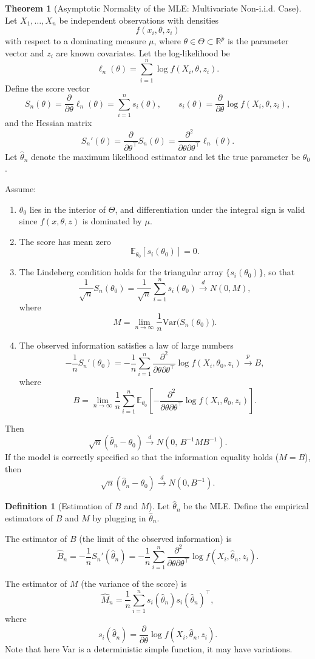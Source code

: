 \documentclass[11pt]{article}
\theoremstyle{definition}
\newtheorem{defn}{Definition}[section]
\newtheorem{theo}{Theorem}[section]
\begin{document}
\begin{theo}[Asymptotic Normality of the MLE: Multivariate Non-i.i.d. Case]
Let $X_1,\dots,X_n$ be independent observations with densities
\[
f(x_i,\theta,z_i)
\]
with respect to a dominating measure $\mu$, where $\theta\in\Theta\subset\mathbb{R}^p$
is the parameter vector and $z_i$ are known covariates. Let the log-likelihood be
\[
\ell_n(\theta)=\sum_{i=1}^n \log f(X_i,\theta,z_i).
\]
Define the score vector
\[
S_n(\theta)
=
\frac{\partial}{\partial\theta}\ell_n(\theta)
=
\sum_{i=1}^n s_i(\theta),
\qquad
s_i(\theta)=\frac{\partial}{\partial\theta}\log f(X_i,\theta,z_i),
\]
and the Hessian matrix
\[
S_n'(\theta)
=
\frac{\partial}{\partial\theta^\top}S_n(\theta)
=
\frac{\partial^2}{\partial\theta\partial\theta^\top}\ell_n(\theta).
\]
Let $\hat\theta_n$ denote the maximum likelihood estimator and let the
true parameter be $\theta_0$.

Assume:
\begin{enumerate}
\item $\theta_0$ lies in the interior of $\Theta$, and differentiation
under the integral sign is valid since $f(x,\theta,z)$ is dominated by $\mu$.
\item The score has mean zero
\[
\mathbb{E}_{\theta_0}[s_i(\theta_0)]=0 .
\]
\item The Lindeberg condition holds for the triangular array
$\{s_i(\theta_0)\}$, so that
\[
\frac{1}{\sqrt{n}}S_n(\theta_0)
=
\frac{1}{\sqrt{n}}\sum_{i=1}^n s_i(\theta_0)
\xrightarrow{d}
N(0,M),
\]
where
\[
M
=
\lim_{n\to\infty}
\frac{1}{n}\mathrm{Var}\big(S_n(\theta_0)\big).
\]
\item The observed information satisfies a law of large numbers
\[
-\frac{1}{n}S_n'(\theta_0)
=
-\frac{1}{n}\sum_{i=1}^n
\frac{\partial^2}{\partial\theta\partial\theta^\top}
\log f(X_i,\theta_0,z_i)
\xrightarrow{p}
B,
\]
where
\[
B
=
\lim_{n\to\infty}
\frac{1}{n}\sum_{i=1}^n
\mathbb{E}_{\theta_0}
\!\left[
-
\frac{\partial^2}{\partial\theta\partial\theta^\top}
\log f(X_i,\theta_0,z_i)
\right].
\]
\end{enumerate}
Then
\[
\sqrt{n}(\hat\theta_n-\theta_0)
\xrightarrow{d}
N\!\left(0,\,B^{-1}MB^{-1}\right).
\]
If the model is correctly specified so that the information equality holds
($M=B$), then
\[
\sqrt{n}(\hat\theta_n-\theta_0)
\xrightarrow{d}
N(0,B^{-1}).
\]
\end{theo}
\begin{defn}[Estimation of $B$ and $M$]
Let $\hat\theta_n$ be the MLE. Define the empirical estimators of $B$ and $M$ by
plugging in $\hat\theta_n$.

The estimator of $B$ (the limit of the observed information) is
\[
\hat B_n
=
-\frac{1}{n}S_n'(\hat\theta_n)
=
-\frac{1}{n}\sum_{i=1}^n
\frac{\partial^2}{\partial\theta\partial\theta^\top}
\log f(X_i,\hat\theta_n,z_i).
\]

The estimator of $M$ (the variance of the score) is
\[
\hat M_n
=
\frac{1}{n}\sum_{i=1}^n
s_i(\hat\theta_n)s_i(\hat\theta_n)^\top,
\]
where
\[
s_i(\hat\theta_n)
=
\frac{\partial}{\partial\theta}
\log f(X_i,\hat\theta_n,z_i).
\]
Note that here Var is a deterministic simple function, it may have variations.
\end{defn}
\end{document}
